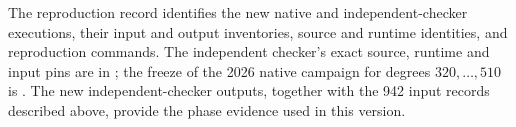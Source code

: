 The reproduction record  identifies the
new native and independent-checker executions, their input and output
inventories, source and runtime identities, and reproduction commands.
The independent checker's exact source, runtime and input pins are in
;
the freeze of the 2026 native campaign for degrees $320,\ldots,510$ is
.
The new independent-checker outputs, together with the 942 input records
described above, provide the phase evidence used in this version.
